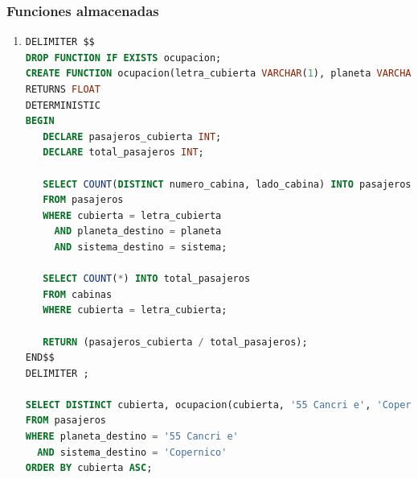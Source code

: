 \documentclass{db-practice}
\begin{document}
\subsubsection*{Funciones almacenadas}
\begin{enumerate}
\item
\begin{lstlisting}[language=SQL]
DELIMITER $$
DROP FUNCTION IF EXISTS ocupacion;
CREATE FUNCTION ocupacion(letra_cubierta VARCHAR(1), planeta VARCHAR(50), sistema VARCHAR(50))
RETURNS FLOAT
DETERMINISTIC
BEGIN
   DECLARE pasajeros_cubierta INT;
   DECLARE total_pasajeros INT;
      
   SELECT COUNT(DISTINCT numero_cabina, lado_cabina) INTO pasajeros_cubierta
   FROM pasajeros
   WHERE cubierta = letra_cubierta 
     AND planeta_destino = planeta 
     AND sistema_destino = sistema;
   
   SELECT COUNT(*) INTO total_pasajeros
   FROM cabinas
   WHERE cubierta = letra_cubierta;
   
   RETURN (pasajeros_cubierta / total_pasajeros);
END$$   
DELIMITER ;

SELECT DISTINCT cubierta, ocupacion(cubierta, '55 Cancri e', 'Copernico')
FROM pasajeros
WHERE planeta_destino = '55 Cancri e'
  AND sistema_destino = 'Copernico'
ORDER BY cubierta ASC;
\end{lstlisting}
\end{enumerate}
\end{document}
